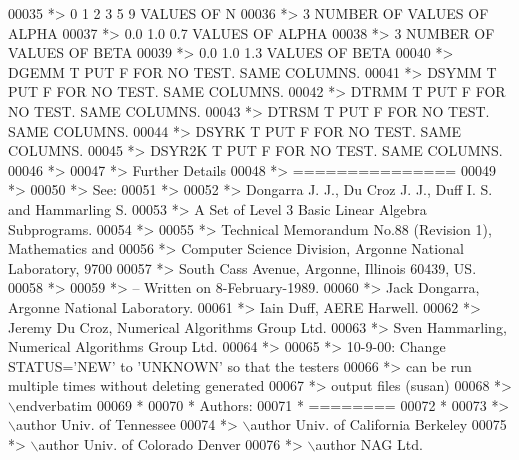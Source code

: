 \begin{DoxyCode}
00035 \textcolor{comment}{*> 0 1 2 3 5 9       VALUES OF N}
00036 \textcolor{comment}{*> 3                 NUMBER OF VALUES OF ALPHA}
00037 \textcolor{comment}{*> 0.0 1.0 0.7       VALUES OF ALPHA}
00038 \textcolor{comment}{*> 3                 NUMBER OF VALUES OF BETA}
00039 \textcolor{comment}{*> 0.0 1.0 1.3       VALUES OF BETA}
00040 \textcolor{comment}{*> DGEMM  T PUT F FOR NO TEST. SAME COLUMNS.}
00041 \textcolor{comment}{*> DSYMM  T PUT F FOR NO TEST. SAME COLUMNS.}
00042 \textcolor{comment}{*> DTRMM  T PUT F FOR NO TEST. SAME COLUMNS.}
00043 \textcolor{comment}{*> DTRSM  T PUT F FOR NO TEST. SAME COLUMNS.}
00044 \textcolor{comment}{*> DSYRK  T PUT F FOR NO TEST. SAME COLUMNS.}
00045 \textcolor{comment}{*> DSYR2K T PUT F FOR NO TEST. SAME COLUMNS.}
00046 \textcolor{comment}{*>}
00047 \textcolor{comment}{*> Further Details}
00048 \textcolor{comment}{*> ===============}
00049 \textcolor{comment}{*>}
00050 \textcolor{comment}{*> See:}
00051 \textcolor{comment}{*>}
00052 \textcolor{comment}{*>    Dongarra J. J., Du Croz J. J., Duff I. S. and Hammarling S.}
00053 \textcolor{comment}{*>    A Set of Level 3 Basic Linear Algebra Subprograms.}
00054 \textcolor{comment}{*>}
00055 \textcolor{comment}{*>    Technical Memorandum No.88 (Revision 1), Mathematics and}
00056 \textcolor{comment}{*>    Computer Science Division, Argonne National Laboratory, 9700}
00057 \textcolor{comment}{*>    South Cass Avenue, Argonne, Illinois 60439, US.}
00058 \textcolor{comment}{*>}
00059 \textcolor{comment}{*> -- Written on 8-February-1989.}
00060 \textcolor{comment}{*>    Jack Dongarra, Argonne National Laboratory.}
00061 \textcolor{comment}{*>    Iain Duff, AERE Harwell.}
00062 \textcolor{comment}{*>    Jeremy Du Croz, Numerical Algorithms Group Ltd.}
00063 \textcolor{comment}{*>    Sven Hammarling, Numerical Algorithms Group Ltd.}
00064 \textcolor{comment}{*>}
00065 \textcolor{comment}{*>    10-9-00:  Change STATUS='NEW' to 'UNKNOWN' so that the testers}
00066 \textcolor{comment}{*>              can be run multiple times without deleting generated}
00067 \textcolor{comment}{*>              output files (susan)}
00068 \textcolor{comment}{*> \(\backslash\)endverbatim}
00069 \textcolor{comment}{*}
00070 \textcolor{comment}{*  Authors:}
00071 \textcolor{comment}{*  ========}
00072 \textcolor{comment}{*}
00073 \textcolor{comment}{*> \(\backslash\)author Univ. of Tennessee }
00074 \textcolor{comment}{*> \(\backslash\)author Univ. of California Berkeley }
00075 \textcolor{comment}{*> \(\backslash\)author Univ. of Colorado Denver }
00076 \textcolor{comment}{*> \(\backslash\)author NAG Ltd. }

\end{DoxyCode}
